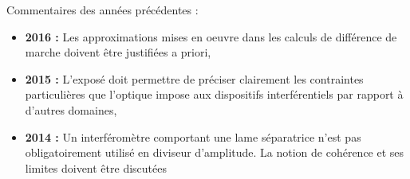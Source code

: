 \begin{reportBlock}{Commentaires des années précédentes :}
    \begin{itemize}
        \item \textbf{2016 :} Les approximations mises en oeuvre dans les calculs de différence de marche doivent être justifiées a priori,
        \item \textbf{2015 :} L’exposé doit permettre de préciser clairement les contraintes particulières que l’optique impose aux dispositifs interférentiels par rapport à d’autres domaines,
        \item \textbf{2014 :} Un interféromètre comportant une lame séparatrice n’est pas obligatoirement utilisé en diviseur d’amplitude. La notion de cohérence et ses limites doivent être discutées
    \end{itemize}
\end{reportBlock}
